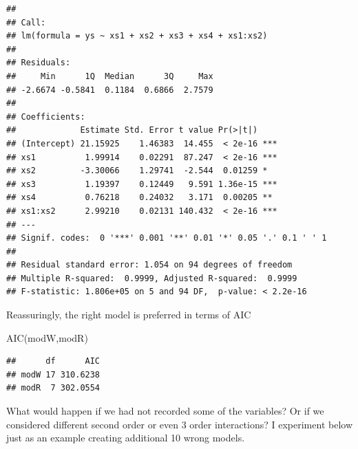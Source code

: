 \documentclass[
]{book}
\newenvironment{Shaded}{\begin{snugshade}}{\end{snugshade}}
\newcommand{\FunctionTok}[1]{\textcolor[rgb]{0.00,0.00,0.00}{#1}}
\newcommand{\NormalTok}[1]{#1}
\begin{document}
\begin{verbatim}
## 
## Call:
## lm(formula = ys ~ xs1 + xs2 + xs3 + xs4 + xs1:xs2)
## 
## Residuals:
##     Min      1Q  Median      3Q     Max 
## -2.6674 -0.5841  0.1184  0.6866  2.7579 
## 
## Coefficients:
##             Estimate Std. Error t value Pr(>|t|)    
## (Intercept) 21.15925    1.46383  14.455  < 2e-16 ***
## xs1          1.99914    0.02291  87.247  < 2e-16 ***
## xs2         -3.30066    1.29741  -2.544  0.01259 *  
## xs3          1.19397    0.12449   9.591 1.36e-15 ***
## xs4          0.76218    0.24032   3.171  0.00205 ** 
## xs1:xs2      2.99210    0.02131 140.432  < 2e-16 ***
## ---
## Signif. codes:  0 '***' 0.001 '**' 0.01 '*' 0.05 '.' 0.1 ' ' 1
## 
## Residual standard error: 1.054 on 94 degrees of freedom
## Multiple R-squared:  0.9999, Adjusted R-squared:  0.9999 
## F-statistic: 1.806e+05 on 5 and 94 DF,  p-value: < 2.2e-16
\end{verbatim}

Reassuringly, the right model is preferred in terms of AIC

\begin{Shaded}
\begin{Highlighting}[]
\FunctionTok{AIC}\NormalTok{(modW,modR)}
\end{Highlighting}
\end{Shaded}

\begin{verbatim}
##      df      AIC
## modW 17 310.6238
## modR  7 302.0554
\end{verbatim}

What would happen if we had not recorded some of the variables? Or if we considered different second order or even 3 order interactions? I experiment below just as an example creating additional 10 wrong models.
\end{document}
